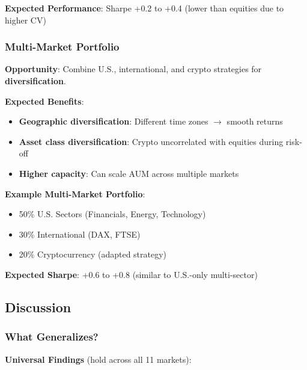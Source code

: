 \textbf{Expected Performance}: Sharpe +0.2 to +0.4 (lower than equities due to higher CV)

\subsubsection{Multi-Market Portfolio}

\textbf{Opportunity}: Combine U.S., international, and crypto strategies for \textbf{diversification}.

\textbf{Expected Benefits}:
\begin{itemize}
\item \textbf{Geographic diversification}: Different time zones $\rightarrow$ smooth returns
\item \textbf{Asset class diversification}: Crypto uncorrelated with equities during risk-off
\item \textbf{Higher capacity}: Can scale AUM across multiple markets
\end{itemize}

\textbf{Example Multi-Market Portfolio}:
\begin{itemize}
\item 50\% U.S. Sectors (Financials, Energy, Technology)
\item 30\% International (DAX, FTSE)
\item 20\% Cryptocurrency (adapted strategy)
\end{itemize}

\textbf{Expected Sharpe}: +0.6 to +0.8 (similar to U.S.-only multi-sector)

\subsection{Discussion}

\subsubsection{What Generalizes?}

\textbf{Universal Findings} (hold across all 11 markets):

